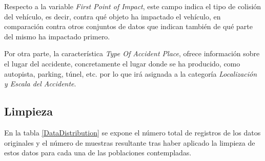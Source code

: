 Respecto a la variable \textit{First Point of Impact}, este campo indica el tipo de colisión del vehículo, es decir, contra qué objeto ha impactado el vehículo, en comparación contra otros conjuntos de datos que indican también de qué parte del mismo ha impactado primero.

Por otra parte, la característica \textit{Type Of Accident Place}, ofrece información sobre el lugar del accidente, concretamente el lugar donde se ha producido, como autopista, parking, túnel, etc. por lo que irá asignada a la categoría \textit{Localización y Escala del Accidente}.



\subsection{Limpieza}
En la tabla \ref{DataDistribution} se expone el número total de registros de los datos originales y el número de muestras resultante tras haber aplicado la limpieza de estos datos para cada una de las poblaciones contempladas.

